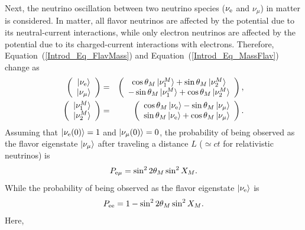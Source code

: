 \hs
Next, the neutrino oscillation between two neutrino species ($\nu_{\rm e}$ and $\nu_{\mu}$) in matter is considered.
In matter, all flavor neutrinos are affected by the potential due to its neutral-current interactions, while only electron neutrinos are affected by the potential due to its charged-current interactions with electrons.
Therefore, Equation~(\ref{Introd_Eq_FlavMass}) and Equation~(\ref{Introd_Eq_MassFlav}) change as
\begin{eqnarray}
	\left(
	\begin{array}{c}
		\ket{\nu_{\rm e}} \\
		\ket{\nu_{\mu}}
	\end{array}
	\right)
	&=& \left(
	\begin{array}{c}
		\cos\theta_{M}\ket{\nu_{1}^{M}}+\sin\theta_{M}\ket{\nu_{2}^{M}} \\
		-\sin\theta_{M}\ket{\nu_{1}^{M}}+\cos\theta_{M}\ket{\nu_{2}^{M}}
	\end{array}
	\right), \\
	\left(
	\begin{array}{c}
		\ket{\nu_{1}^{M}} \\
		\ket{\nu_{2}^{M}}
	\end{array}
	\right)
	&=& \left(
	\begin{array}{c}
		\cos\theta_{M}\ket{\nu_{\rm e}}-\sin\theta_{M}\ket{\nu_{\mu}} \\
		\sin\theta_{M}\ket{\nu_{\rm e}}+\cos\theta_{M}\ket{\nu_{\mu}}
	\end{array}
	\right).
\end{eqnarray}
Assuming that $\ket{\nu_{\rm e}(0)} = 1$ and $\ket{\nu_{\mu}(0)} = 0$, the probability of being observed as the flavor eigenstate $\ket{\nu_{\mu}}$ after traveling a distance $L$ ($\simeq ct$ for relativistic neutrinos) is
\begin{eqnarray}
	P_{{\rm e}\mu} = \sin^{2}2\theta_{M}\sin^{2}X_{M}.
\end{eqnarray}
While the probability of being observed as the flavor eigenstate $\ket{\nu_{\rm e}}$ is
\begin{eqnarray}
	P_{{\rm ee}} = 1 - \sin^{2}2\theta_{M}\sin^{2}X_{M}.
\end{eqnarray}
Here,
